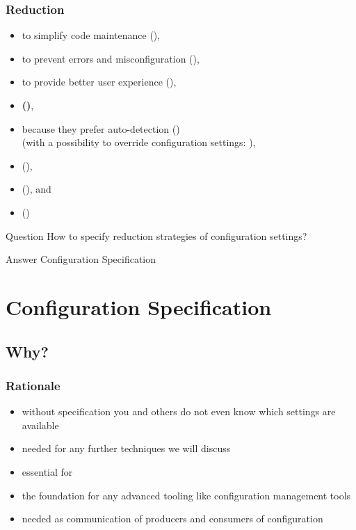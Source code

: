 \begin{frame}
	\frametitle{Reduction}
	\methodQuestion{}
	\begin{itemize}
	\item to simplify code maintenance (),
	\item to prevent errors and misconfiguration (),
	\item to provide better user experience (),
	\item \textbf{ ()},
	\item because they prefer auto-detection () \\ (with a possibility to override configuration settings: ),
	\item {} (),
	\item {} (), and
	\item {} ()
	\end{itemize}
\end{frame}

\begin{frame}
	\begin{alertblock}{Question}
	How to specify reduction strategies of configuration settings?
	\end{alertblock}
	\pause
	\begin{exampleblock}{Answer}
	Configuration Specification
	\end{exampleblock}
\end{frame}



\section{Configuration Specification}

\subsection{Why?}

\begin{frame}
	\frametitle{Rationale}
	\begin{itemize}
	\item without specification you and others do not even know which settings are available
	\item needed for any further techniques we will discuss
	\pause
	\item essential for ~\citet{holland2001nofutz}
	\item the foundation for any advanced tooling like configuration management tools
	\pause
	\item needed as communication of producers and consumers of configuration
	\end{itemize}
\end{frame}


\nocite{raab2017introducing}

\appendix

\begin{frame}[allowframebreaks]
	
	
\end{frame}




